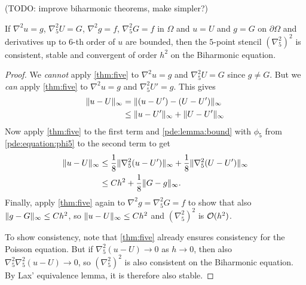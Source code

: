(TODO: improve biharmonic theorems, make simpler?)

\begin{theorem}
If $\nabla^2 u = g$, $\nabla_5^2 U = G$, $\nabla^2 g = f$, $\nabla_5^2 G = f$ in $\Omega$ and $u=U$ and $g=G$ on $\partial \Omega$ and derivatives up to $6$-th order of $u$ are bounded,
then the $5$-point stencil $(\nabla_5^2)^2$ is consistent, stable and convergent of order $h^2$ on the Biharmonic equation.
\label{pde:lemma:fivebi}
\end{theorem}
\begin{proof}
We \emph{cannot} apply \cref{thm:five} to $\nabla^2 u = g$ and $\nabla_5^2 U = G$ since $g \neq G$.
But we \emph{can} apply \cref{thm:five} to $\nabla^2 u = g$ and $\nabla_5^2 U' = g$.
This gives
\begin{equation*}
\begin{split}
	\lVert u-U \rVert_\infty &= \lVert (u-U') - (U-U') \rVert_\infty \\
                &\leq \lVert u-U' \rVert_\infty + \lVert U-U' \rVert_\infty \\
\end{split}
\end{equation*}
Now apply \cref{thm:five} to the first term and \cref{pde:lemma:bound} with $\phi_5$ from \ref{pde:equation:phi5} to the second term to get
\begin{equation*}
\begin{split}
	\lVert u-U \rVert_\infty &\leq \frac18 \lVert \nabla_5^2(u-U') \rVert_\infty + \frac18 \lVert \nabla_5^2(U-U') \rVert_\infty \\
				&\leq Ch^2 + \frac18 \lVert G-g \rVert_\infty. \\
\end{split}
\end{equation*}
Finally, apply \cref{thm:five} again to $\nabla^2 g = \nabla_5^2 G = f$ to show that also $\lVert g-G \rVert_\infty \leq Ch^2$, so $\lVert u-U \rVert_\infty \leq Ch^2$ and $(\nabla_5^2)^2$ is $\mathcal{O}(h^2)$.

To show consistency, note that \cref{thm:five} already ensures consistency for the Poisson equation.
But if $\nabla_5^2(u-U) \rightarrow 0$ as $h \rightarrow 0$, then also $\nabla_5^2 \nabla_5^2 (u-U) \rightarrow 0$, so $(\nabla_5^2)^2$ is also consistent on the Biharmonic equation.
By Lax' equivalence lemma, it is therefore also stable.
\end{proof}

